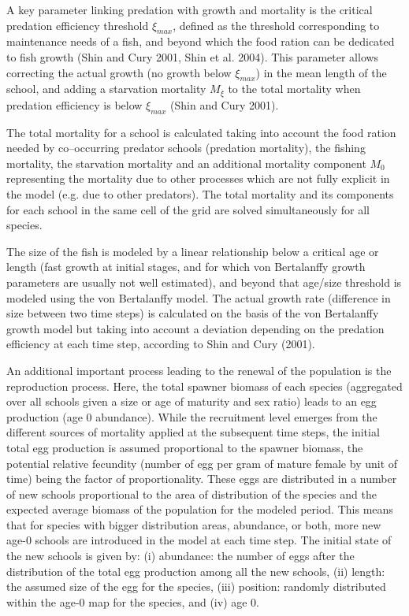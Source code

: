 \documentclass[10pt,a4paper]{article}
\begin{document}
A key parameter linking predation with growth and mortality is the critical predation efficiency threshold $\xi_{max}$, defined as the threshold corresponding to maintenance needs of a fish, and beyond which the food ration can be dedicated to fish growth (Shin and Cury 2001, Shin et al. 2004). This parameter allows correcting the actual growth (no growth below $\xi_{max}$) in the mean length of the school, and adding a starvation mortality $M_\xi$ to the total mortality when predation efficiency is below $\xi_{max}$ (Shin and Cury 2001). 

The total mortality for a school is calculated taking into account the food ration needed by co--occurring predator schools (predation mortality), the fishing mortality, the starvation mortality and an additional mortality component $M_0$ representing the mortality due to other processes which are not fully explicit in the model (e.g. due to other predators). The total mortality and its components for each school in the same cell of the grid are solved simultaneously for all species. 

The size of the fish is modeled by a linear relationship below a critical age or length (fast growth at initial stages, and for which von Bertalanffy growth parameters are usually not well estimated), and beyond that age/size threshold is modeled using the von Bertalanffy model. The actual growth rate (difference in size between two time steps) is calculated on the basis of the von Bertalanffy growth model but taking into account a deviation depending on the predation efficiency at each time step, according to Shin and Cury (2001).

An additional important process leading to the renewal of the population is the reproduction process. Here, the total spawner biomass of each species (aggregated over all schools given a size or age of maturity and sex ratio) leads to an egg production (age 0 abundance). While the recruitment level emerges from the different sources of mortality applied at the subsequent time steps, the initial total egg production is assumed proportional to the spawner biomass, the potential relative fecundity (number of egg per gram of mature female by unit of time) being the factor of proportionality. These eggs are distributed in a number of new schools proportional to the area of distribution of the species and the expected average biomass of the population for the modeled period. This means that for species with bigger distribution areas, abundance, or both, more new age-0 schools are introduced in the model at each time step. The initial state of the new schools is given by: (i) abundance: the number of eggs after the distribution of the total egg production among all the new schools, (ii) length: the assumed size of the egg for the species, (iii) position: randomly distributed within the age-0 map for the species, and (iv) age 0.
\end{document}
